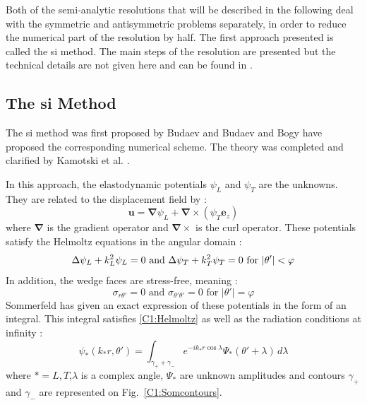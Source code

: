 Both of the semi-analytic resolutions that will be described in the following deal with the symmetric and antisymmetric problems separately, in order to reduce the numerical part of the resolution by half. The first approach presented is called the \acrfull{si} method. The main steps of the resolution are presented but the technical details are not given here and can be found in \cite{AKDthese}.

\subsection{The \acrfull{si} Method}
The \acrfull{si} method was first proposed by Budaev \cite{BudaevBook,Budaev1,Budaev2} and Budaev and Bogy \cite{Rayleigh,Rayleigh2,Rayleigh3} have proposed the corresponding numerical scheme. The theory was completed and clarified by Kamotski et al. \cite{KamotskiFradkin}.

In this approach, the elastodynamic potentials $\psi_L$ and $\psi_T$ are the unknowns. They are related to the displacement field by :
\begin{equation}
\mathbf{u}=\mathbf{\nabla}\psi_L+\mathbf{\nabla}\times(\psi_T\mathbf{e}_z)
\label{C1:elastopotentials}
\end{equation}
where $\mathbf{\nabla}$ is the gradient operator and $\mathbf{\nabla}\times$ is the curl operator. These potentials satisfy the Helmoltz equations in the angular domain \cite{Achenbach} :
\begin{equation}
\Delta \psi_L+k_L^2\psi_L=0 \mbox{ and } \Delta \psi_T+k_T^2\psi_T=0 \rm \mbox{ for } |\theta'|<\varphi
\label{C1:Helmoltz}
\end{equation}
In addition, the wedge faces are stress-free, meaning :
\begin{equation}
\sigma_{r\theta'}=0 \mbox{ and } \sigma_{\theta'\theta'}=0 \mbox{ for } |\theta'|=\varphi
\label{C1:stresses}
\end{equation}
Sommerfeld \cite{Sommerfeld} has given an exact expression of these potentials in the form of an integral. This integral satisfies \eqref{C1:Helmoltz} as well as the radiation conditions at infinity \cite{SMtechnique} :
\begin{equation}
\psi_*(k_*r,\theta')=\int_{\gamma_++\gamma_-}e^{-ik_*r\cos\lambda}\Psi_*(\theta'+\lambda)\,d\lambda
\label{C1:Sommerfeld}
\end{equation}
where $*=L,T$,$\lambda$ is a complex angle, $\Psi_*$ are unknown amplitudes and contours $\gamma_+$ and $\gamma_-$ are represented on Fig.~\ref{C1:Somcontours}.

